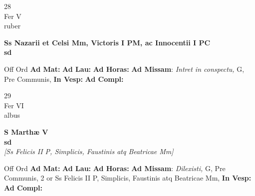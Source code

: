 \documentclass[10pt, openany]{book}
\begin{document}
        \begin{center}
            \begin{minipage}{3.5in}
                \vspace{2em}
                \begin{minipage}{0.5in}
                    {\Huge 28} \\
                    {\normalsize Fer V} \\
                    {\normalsize ruber}
                \end{minipage}
                \begin{minipage}{3.0in}
                    \textbf{ \large Ss Nazarii et Celsi Mm, Victoris I PM, ac Innocentii I PC \\
                    \textnormal{\normalsize sd}} \\ 
                \end{minipage}
                \begin{justify}Off Ord
                    \textbf{Ad Mat: }
                    \textbf{Ad Lau: }
                    \textbf{Ad Horas: }\textbf{Ad Missam}: \textit{Intret in conspectu,} G, Pre Communis,  
                    \textbf{In Vesp: }
                    \textbf{Ad Compl: }
                \end{justify}
            \end{minipage}
        \end{center}
    
        \begin{center}
            \begin{minipage}{3.5in}
                \vspace{2em}
                \begin{minipage}{0.5in}
                    {\Huge 29} \\
                    {\normalsize Fer VI} \\
                    {\normalsize albus}
                \end{minipage}
                \begin{minipage}{3.0in}
                    \textbf{ \large S Marthæ V \\
                    \textnormal{\normalsize sd}} \\ \textit{[Ss Felicis II P, Simplicis, Faustinis atq Beatricae Mm]} \\ 
                \end{minipage}
                \begin{justify}Off Ord
                    \textbf{Ad Mat: }
                    \textbf{Ad Lau: }
                    \textbf{Ad Horas: }\textbf{Ad Missam}: \textit{Dilexisti,} G, Pre Communis, 2 or Ss Felicis II P, Simplicis, Faustinis atq Beatricae Mm,  
                    \textbf{In Vesp: }
                    \textbf{Ad Compl: }
                \end{justify}
            \end{minipage}
        \end{center}
    
\end{document}
